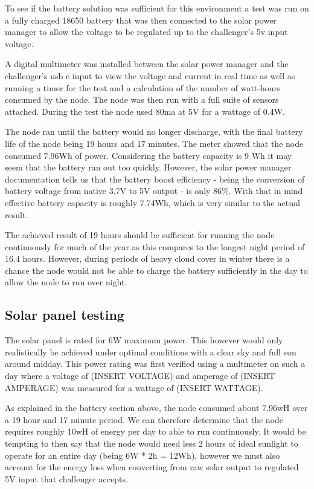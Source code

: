 To see if the battery solution was sufficient for this environment a test was
run on a fully charged 18650 battery that was then connected to the solar power
manager to allow the voltage to be regulated up to the challenger's 5v input
voltage.

A digital multimeter was installed between the solar power manager and the
challenger's usb c input to view the voltage and current in real time as well as
running a timer for the test and a calculation of the number of watt-hours
consumed by the node. The node was then run with a full suite of sensors
attached. During the test the node used 80ma at 5V for a wattage of 0.4W.

The node ran until the battery would no longer discharge, with the final battery
life of the node being 19 hours and 17 minutes. The meter showed that the node
consumed 7.96Wh of power. Considering the battery capacity is 9 Wh it may seem
that the battery ran out too quickly. However, the solar power manager
documentation tells us that the battery boost efficiency - being the conversion
of battery voltage from native 3.7V to 5V output - is only 86\%. With that in
mind effective battery capacity is roughly 7.74Wh, which is very similar to the
actual result.

The achieved result of 19 hours should be sufficient for running the node
continuously for much of the year as this compares to the longest night period
of 16.4 hours. However, during periods of heavy cloud cover in winter there is a
chance the node would not be able to charge the battery sufficiently in the day
to allow the node to run over night.

\subsection{Solar panel testing}

The solar panel is rated for 6W maximum power. This however would only
realistically be achieved under optimal conditions with a clear sky and full sun
around midday. This power rating was first verified using a multimeter on such a
day where a voltage of (INSERT VOLTAGE) and amperage of (INSERT AMPERAGE) was
measured for a wattage of (INSERT WATTAGE).

As explained in the battery section above, the node consumed about 7.96wH over a
19 hour and 17 minute period. We can therefore determine that the node requires
roughly 10wH of energy per day to able to run continuously. It would be tempting
to then say that the node would need less 2 hours of ideal sunlight to operate
for an entire day (being 6W * 2h = 12Wh), however we must also account for the
energy loss when converting from raw solar output to regulated 5V input that
challenger accepts.

